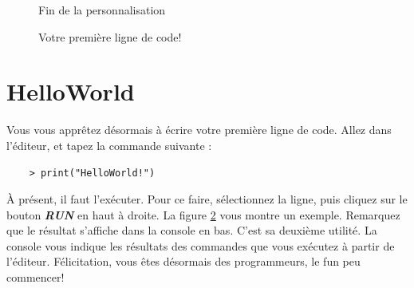 \documentclass[10.5pt,a4paper]{article}
\begin{document}
\begin{figure}[H]
  \centering
  \caption{Fin de la personnalisation}
  \label{rstudio3}
\end{figure}

\begin{figure}[H]
  \centering
  \caption{Votre première ligne de code!}
  \label{rstudio4}
\end{figure}


\section{HelloWorld}

Vous vous apprêtez désormais à écrire votre première ligne de code. Allez dans l'éditeur, et tapez la commande suivante :
    \begin{lstlisting}
    > print("HelloWorld!")
    \end{lstlisting}
À présent, il faut l'exécuter. Pour ce faire, sélectionnez la ligne, puis cliquez sur le bouton \textit{\textbf{RUN}} en haut à droite. La figure \ref{rstudio4} vous montre un exemple. Remarquez que le résultat s'affiche dans la console en bas. C'est sa deuxième utilité. La console vous indique les résultats des commandes que vous exécutez à partir de l'éditeur. Félicitation, vous êtes désormais des programmeurs, le fun peu commencer! 
\end{document}
